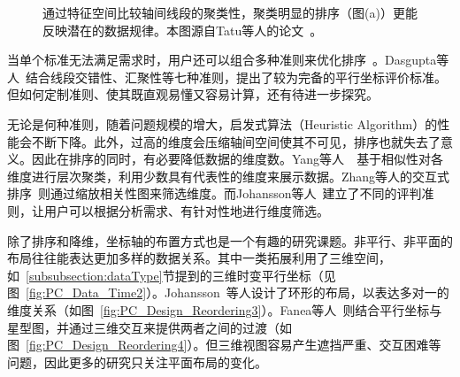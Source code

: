 \documentclass[12pt,twocolumn]{article}
\begin{document}
\begin{figure}[!htb]
\centering
{}
\caption{\label{fig:PC_Design_Reordering2}通过特征空间比较轴间线段的聚类性，聚类明显的排序（图(a)）更能反映潜在的数据规律。本图源自Tatu等人的论文~\citep{tatu2011automated}。}
\end{figure}

当单个标准无法满足需求时，用户还可以组合多种准则来优化排序~\citep{johansson2009interactive}。Dasgupta等人~\citep{dasgupta2010pargnostics}结合线段交错性、汇聚性等七种准则，提出了较为完备的平行坐标评价标准。但如何定制准则、使其既直观易懂又容易计算，还有待进一步探究。

无论是何种准则，随着问题规模的增大，启发式算法（Heuristic Algorithm）的性能会不断下降。此外，过高的维度会压缩轴间空间使其不可见，排序也就失去了意义。因此在排序的同时，有必要降低数据的维度数。Yang等人~\citep{yang2002visual}~\citep{yang2003interactive}基于相似性对各维度进行层次聚类，利用少数具有代表性的维度来展示数据。Zhang等人的交互式排序~\citep{zhang2012network}则通过缩放相关性图来筛选维度。而Johansson等人~\citep{johansson2009interactive}建立了不同的评判准则，让用户可以根据分析需求、有针对性地进行维度筛选。

除了排序和降维，坐标轴的布置方式也是一个有趣的研究课题。非平行、非平面的布局往往能表达更加多样的数据关系。其中一类拓展利用了三维空间，如~\ref{subsubsection:dataType}节提到的三维时变平行坐标（见图~\ref{fig:PC_Data_Time2}）。Johansson~\citep{johansson20053}等人设计了环形的布局，以表达多对一的维度关系（如图~\ref{fig:PC_Design_Reordering3}）。Fanea等人~\citep{fanea2005interactive}则结合平行坐标与星型图，并通过三维交互来提供两者之间的过渡（如图~\ref{fig:PC_Design_Reordering4}）。但三维视图容易产生遮挡严重、交互困难等问题，因此更多的研究只关注平面布局的变化。
\end{document}
